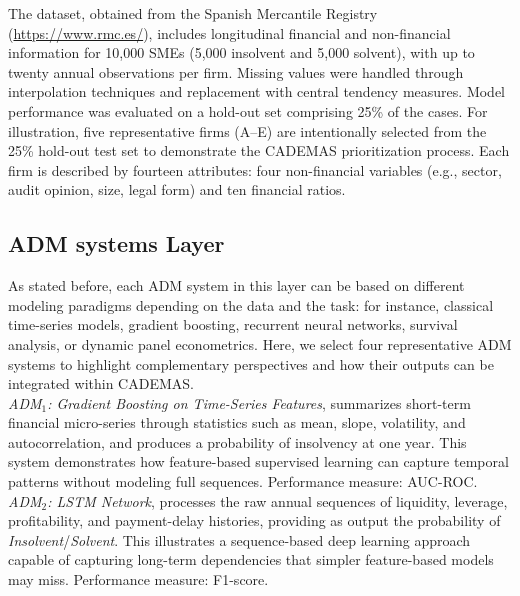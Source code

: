 \documentclass[letterpaper, 10 pt,conference]{IEEEconf}
\begin{document}
The dataset, obtained from the Spanish Mercantile Registry (\url{https://www.rmc.es/}), includes longitudinal financial and non-financial information for 10,000 SMEs (5,000 insolvent and 5,000 solvent), with up to twenty annual observations per firm. Missing values were handled through interpolation techniques and replacement with central tendency measures. Model performance was evaluated on a hold-out set comprising 25\% of the cases. For illustration, five representative firms (A–E) are intentionally selected from the 25\% hold-out test set to demonstrate the CADEMAS prioritization process. Each firm is described by fourteen attributes: four non-financial variables (e.g., sector, audit opinion, size, legal form) and ten financial ratios.


\subsection{ADM systems Layer}

As stated before, each ADM system in this layer can be based on different modeling paradigms depending on the data and the task: for instance, classical time-series models, gradient boosting, recurrent neural networks, survival analysis, or dynamic panel econometrics. Here, we select four representative ADM systems to highlight complementary perspectives and how their outputs can be integrated within CADEMAS.\\

\noindent
\textit{ADM$_1$: Gradient Boosting on Time-Series Features}, summarizes short-term financial micro-series through statistics such as mean, slope, volatility, and autocorrelation, and produces a probability of insolvency at one year. This system demonstrates how feature-based supervised learning can capture temporal patterns without modeling full sequences. Performance measure: AUC-ROC.\\

\noindent
\textit{ADM$_2$: LSTM Network}, processes the raw annual sequences of liquidity, leverage, profitability, and payment-delay histories, providing as output the probability of \textit{Insolvent}/\textit{Solvent}. This illustrates a sequence-based deep learning approach capable of capturing long-term dependencies that simpler feature-based models may miss. Performance measure: F1-score.\\
\end{document}

